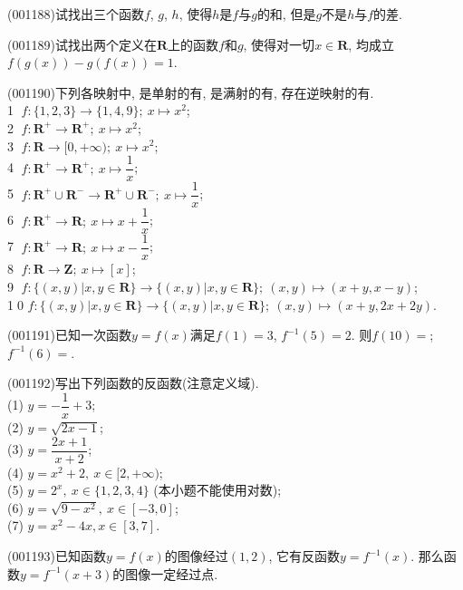\item (001188)试找出三个函数$f$, $g$, $h$, 使得$h$是$f$与$g$的和, 但是$g$不是$h$与$f$的差.
\item (001189)试找出两个定义在$\mathbf{R}$上的函数$f$和$g$, 使得对一切$x\in \mathbf{R}$, 均成立$f(g(x))-g(f(x))=1$.
\item (001190)下列各映射中, 是单射的有, 是满射的有, 存在逆映射的有.\\ 
\textcircled{1} $f: \{1,2,3\}\rightarrow \{1,4,9\}; \ x\mapsto x^2$;\\ 
\textcircled{2} $f: \mathbf{R}^+\rightarrow \mathbf{R}^+; \ x \mapsto x^2$;\\ 
\textcircled{3} $f: \mathbf{R}\rightarrow [0,+\infty); \ x \mapsto x^2$;\\ 
\textcircled{4} $f: \mathbf{R}^+\rightarrow \mathbf{R}^+; \ x \mapsto \dfrac{1}{x}$;\\ 
\textcircled{5} $f: \mathbf{R}^+\cup \mathbf{R}^-\rightarrow \mathbf{R}^+\cup \mathbf{R}^-; \ x \mapsto \dfrac{1}{x}$;\\ 
\textcircled{6} $f: \mathbf{R}^+\rightarrow \mathbf{R}; \ x \mapsto x+\dfrac{1}{x}$;\\ 
\textcircled{7} $f: \mathbf{R}^+\rightarrow \mathbf{R}; \ x \mapsto x-\dfrac{1}{x}$;\\ 
\textcircled{8} $f: \mathbf{R}\rightarrow \mathbf{Z}; \ x \mapsto [x]$;\\ 
\textcircled{9} $f: \{(x,y)|x,y\in \mathbf{R}\}\rightarrow \{(x,y)|x,y\in \mathbf{R}\};\ (x,y)\mapsto (x+y,x-y)$;\\ 
\textcircled{10} $f: \{(x,y)|x,y\in \mathbf{R}\}\rightarrow \{(x,y)|x,y\in \mathbf{R}\};\ (x,y)\mapsto (x+y,2x+2y)$.
\item (001191)已知一次函数$y=f(x)$满足$f(1)=3$, $f^{-1}(5)=2$. 则$f(10)=$; $f^{-1}(6)=$.
\item (001192)写出下列函数的反函数(注意定义域).\\ 
(1) $y=-\dfrac{1}{x}+3$;\\ 
(2) $y=\sqrt{2x-1}$;\\ 
(3) $y=\dfrac{2x+1}{x+2}$;\\ 
(4) $y=x^2+2, \ x\in [2,+\infty)$;\\ 
(5) $y=2^x, \ x\in \{1,2,3,4\}$ (本小题不能使用对数);\\ 
(6) $y=\sqrt{9-x^2}, \ x\in [-3,0]$;\\ 
(7) $y=x^2-4x, x \in [3,7]$.
\item (001193)已知函数$y=f(x)$的图像经过$(1,2)$, 它有反函数$y=f^{-1}(x)$. 那么函数$y=f^{-1}(x+3)$的图像一定经过点.
